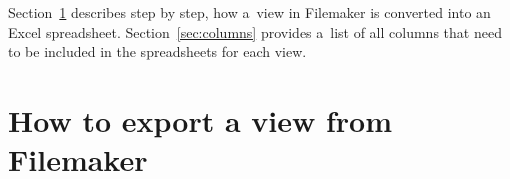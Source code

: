 \documentclass[12pt,a4paper]{scrartcl}
\begin{document}
\begin{center}
\end{center}

Section~\ref{sec:howto} describes step by step, how a~view in Filemaker is
converted into an Excel spreadsheet.
Section~\ref{sec:columns} provides a~list of all columns that need to be
included in the spreadsheets for each view.


\section{How to export a view from Filemaker}%
\label{sec:howto}
\end{document}
